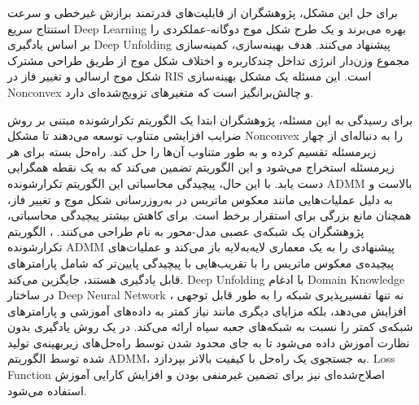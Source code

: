 برای حل این مشکل، پژوهشگران از قابلیت‌های قدرتمند برازش غیرخطی و سرعت استنتاج سریع 
\gls{Deep Learning}
 بهره می‌برند و یک طرح شکل موج دوگانه-عملکردی را بر اساس یادگیری 
\gls{Deep Unfolding}
  پیشنهاد می‌کنند. هدف بهینه‌سازی، کمینه‌سازی مجموع وزن‌دار انرژی تداخل چندکاربره و اختلاف شکل موج از طریق طراحی مشترک شکل موج ارسالی و تغییر فاز در 
\gls{RIS}
   است. این مسئله یک مشکل بهینه‌سازی 
\gls{Nonconvex}
    و چالش‌برانگیز است که متغیرهای تزویج‌شده‌ای دارد.
    
برای رسیدگی به این مسئله، پژوهشگران ابتدا یک الگوریتم تکرارشونده مبتنی بر روش ضرایب افزایشی متناوب توسعه می‌دهند تا مشکل 
\gls{Nonconvex}
 را به دنباله‌ای از چهار زیرمسئله تقسیم کرده و به طور متناوب آن‌ها را حل کند. راه‌حل بسته برای هر زیرمسئله استخراج می‌شود و این الگوریتم تضمین می‌کند که به یک نقطه همگرایی دست یابد. با این حال، پیچیدگی محاسباتی این الگوریتم تکرارشونده 
\gls{ADMM}
  بالاست و به دلیل عملیات‌هایی مانند معکوس ماتریس در به‌روزرسانی شکل موج و تغییر فاز، همچنان مانع بزرگی برای استقرار برخط است.
برای کاهش بیشتر پیچیدگی محاسباتی، پژوهشگران یک شبکه‌ی عصبی مدل-محور به نام 
 طراحی می‌کنند. 
،
  الگوریتم تکرارشونده 
\gls{ADMM}
 پیشنهادی را به یک معماری لایه‌به‌لایه باز می‌کند و عملیات‌های پیچیده‌ی معکوس ماتریس را با تقریب‌هایی با پیچیدگی پایین‌تر که شامل پارامترهای قابل یادگیری هستند، جایگزین می‌کند. 
\gls{Deep Unfolding}
 با ادغام 
\gls{Domain Knowledge}
  در ساختار 
\gls{Deep Neural Network}
، نه تنها تفسیرپذیری شبکه را به طور قابل توجهی افزایش می‌دهد، بلکه مزایای دیگری مانند نیاز کمتر به داده‌های آموزشی و پارامترهای شبکه‌ی کمتر را نسبت به شبکه‌های جعبه سیاه ارائه می‌کند. 
در یک روش یادگیری بدون نظارت آموزش داده می‌شود تا به جای محدود شدن توسط راه‌حل‌های زیربهینه‌ی تولید شده توسط الگوریتم 
\gls{ADMM}،
 به جستجوی یک راه‌حل با کیفیت بالاتر بپردازد. 
\gls{Loss Function}
 اصلاح‌شده‌ای نیز برای تضمین غیرمنفی بودن و افزایش کارایی آموزش استفاده می‌شود.
 
